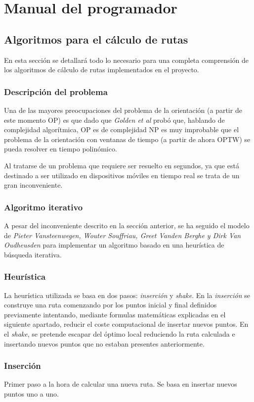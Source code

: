 \section{Manual del programador}
\subsection{Algoritmos para el cálculo de rutas}
En esta sección se detallará todo lo necesario para una completa comprensión de los algoritmos de cálculo de rutas implementados en el proyecto.
\subsubsection{Descripción del problema}

Una de las mayores preocupaciones del problema de la orientación (a partir de este momento OP) es que dado que \textit{Golden et al} probó que, hablando de complejidad algorítmica, OP es de complejidad NP es muy improbable que el problema de la orientación con ventanas de tiempo (a partir de ahora OPTW) se pueda resolver en tiempo polinómico.

Al tratarse de un problema que requiere ser resuelto en segundos, ya que está destinado a ser utilizado en dispositivos móviles en tiempo real se trata de un gran inconveniente.
\subsubsection{Algoritmo iterativo}
A pesar del inconveniente descrito en la sección anterior, se ha seguido el modelo de \textit{Pieter Vansteenwegen, Wouter Souffriau, Greet Vanden Berghe y Dirk Van Oudheusden} para implementar un algoritmo basado en una heurística de búsqueda iterativa.

\subsubsection{Heurística}
La heurística utilizada se basa en dos pasos: \textit{inserción} y \textit{shake}. En la \textit{inserción} se construye una ruta comenzando por los puntos inicial y final definidos previamente intentando, mediante formulas matemáticas explicadas en el siguiente apartado, reducir el coste computacional de insertar nuevos puntos. En el \textit{shake}, se pretende escapar del óptimo local reduciendo la ruta calculada e insertando nuevos puntos que no estaban presentes anteriormente.

\subsubsection{Inserción}
Primer paso a la hora de calcular una nueva ruta. Se basa en insertar nuevos puntos uno a uno.

